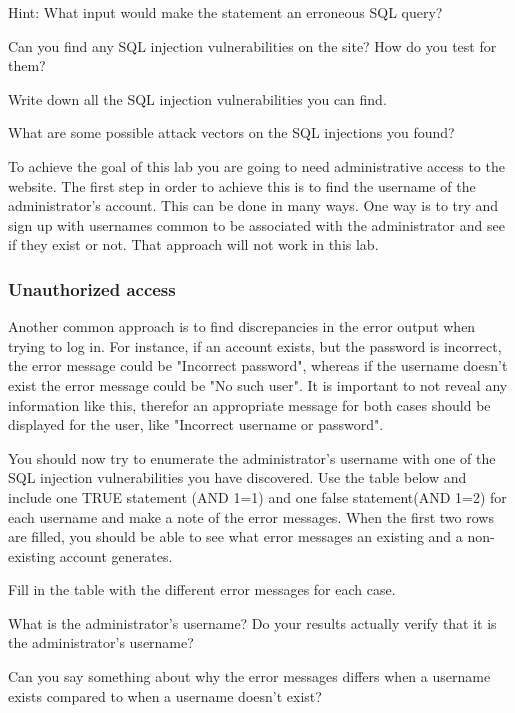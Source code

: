 \documentclass[EITN41]{../tex/cryptosecuritylab}
\begin{document}
Hint: What input would make the statement an erroneous SQL query?
\eprepass

\bprob
\item Can you find any SQL injection vulnerabilities on the site? How do you test for them?
\item Write down all the SQL injection vulnerabilities you can find.
\item What are some possible attack vectors on the SQL injections you found?
\eprob

To achieve the goal of this lab you are going to need administrative access to the website. The first step in order to achieve this is to find the username of the administrator's account. This can be done in many ways. One way is to try and sign up with usernames common to be associated with the administrator and see if they exist or not. That approach will not work in this lab.

\subsubsection{Unauthorized access}

Another common approach is to find discrepancies in the error output when trying to log in. For instance, if an account exists, but the password is incorrect, the error message could be "Incorrect password", whereas if the username doesn't exist the error message could be "No such user". It is important to not reveal any information like this, therefor an appropriate message for both cases should be displayed for the user, like "Incorrect username or password".

You should now try to enumerate the administrator's username with one of the SQL injection vulnerabilities you have discovered. Use the table below and include one TRUE statement (AND 1=1) and one false statement(AND 1=2) for each username and make a note of the error messages. When the first two rows are filled, you should be able to see what error messages an existing and a non-existing account generates.

\bprob
\item Fill in the table with the different error messages for each case.

What is the administrator's username? Do your results actually verify that it is the administrator's username?

Can you say something about why the error messages differs when a username exists compared to when a username doesn't exist?
\eprob
\end{document}
